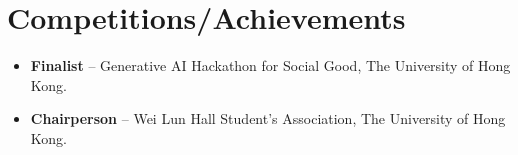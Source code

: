 \documentclass[letterpaper,11pt]{article}
\makeatletter
\newcommand{\resumeItem}[1]{
  \item\small{
    {#1 \vspace{-2pt}}
  }
}
\newcommand{\resumeSubheading}[4]{
  \vspace{-2pt}\item
    \begin{tabular*}{1.0\textwidth}[t]{l@{\extracolsep{\fill}}r}
      \textbf{#1} & \textbf{\small #2} \\
      \textit{\small#3} & \textit{\small #4} \\
    \end{tabular*}\vspace{-7pt}
}
\newcommand{\resumeSubHeadingListStart}{\begin{itemize}[leftmargin=0.0in, label={}]}
\newcommand{\resumeSubHeadingListEnd}{\end{itemize}}
\newcommand{\resumeItemListStart}{\begin{itemize}}
\newcommand{\resumeItemListEnd}{\end{itemize}\vspace{-5pt}}
\makeatother
\begin{document}




\section{Competitions/Achievements}
\resumeItemListStart
\resumeItem{\textbf{Finalist} -- Generative AI Hackathon for Social Good, The University of Hong Kong.}\vspace{-6pt}
\resumeItem{\textbf{Chairperson} -- Wei Lun Hall Student's Association, The University of Hong Kong.}\vspace{-6pt}


\resumeItemListEnd
\end{document}
